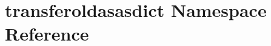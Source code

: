 \hypertarget{namespacetransferoldasasdict}{\section{transferoldasasdict Namespace Reference}
\label{namespacetransferoldasasdict}
}
